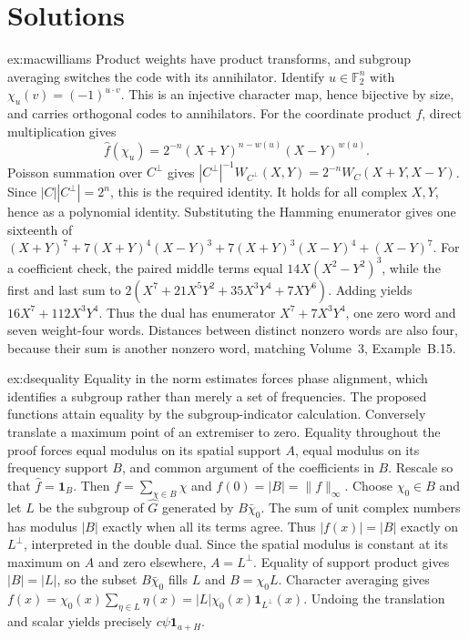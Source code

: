 \section{Solutions}

\begin{solution}{ex:macwilliams}
\idea Product weights have product transforms, and subgroup averaging switches the code with its annihilator.
\writeup Identify $u\in\mathbb F_2^n$ with $\chi_u(v)=(-1)^{u\cdot v}$. This is an injective character map, hence bijective by size, and carries orthogonal codes to annihilators. For the coordinate product $f$, direct multiplication gives
\[
\hat f(\chi_u)=2^{-n}(X+Y)^{n-w(u)}(X-Y)^{w(u)}.
\]
Poisson summation over $C^\perp$ gives
$|C^\perp|^{-1}W_{C^\perp}(X,Y)=2^{-n}W_C(X+Y,X-Y)$.
Since $|C||C^\perp|=2^n$, this is the required identity. It holds for all complex $X,Y$, hence as a polynomial identity.
Substituting the Hamming enumerator gives one sixteenth of
$(X+Y)^7+7(X+Y)^4(X-Y)^3+7(X+Y)^3(X-Y)^4+(X-Y)^7$.
For a coefficient check, the paired middle terms equal $14X(X^2-Y^2)^3$, while the first and last sum to $2(X^7+21X^5Y^2+35X^3Y^4+7XY^6)$. Adding yields $16X^7+112X^3Y^4$. Thus the dual has enumerator $X^7+7X^3Y^4$, one zero word and seven weight-four words. Distances between distinct nonzero words are also four, because their sum is another nonzero word, matching Volume~3, Example~B.15.
\end{solution}

\begin{solution}{ex:dsequality}
\idea Equality in the norm estimates forces phase alignment, which identifies a subgroup rather than merely a set of frequencies.
\writeup The proposed functions attain equality by the subgroup-indicator calculation. Conversely translate a maximum point of an extremiser to zero. Equality throughout the proof forces equal modulus on its spatial support $A$, equal modulus on its frequency support $B$, and common argument of the coefficients in $B$. Rescale so that $\hat f=\mathbf1_B$. Then $f=\sum_{\chi\in B}\chi$ and $f(0)=|B|=\|f\|_\infty$.
Choose $\chi_0\in B$ and let $L$ be the subgroup of $\widehat G$ generated by $B\bar\chi_0$. The sum of unit complex numbers has modulus $|B|$ exactly when all its terms agree. Thus $|f(x)|=|B|$ exactly on $L^\perp$, interpreted in the double dual. Since the spatial modulus is constant at its maximum on $A$ and zero elsewhere, $A=L^\perp$. Equality of support product gives $|B|=|L|$, so the subset $B\bar\chi_0$ fills $L$ and $B=\chi_0L$. Character averaging gives
$f(x)=\chi_0(x)\sum_{\eta\in L}\eta(x)=|L|\chi_0(x)\mathbf1_{L^\perp}(x)$.
Undoing the translation and scalar yields precisely $c\psi\mathbf1_{a+H}$.
\end{solution}

